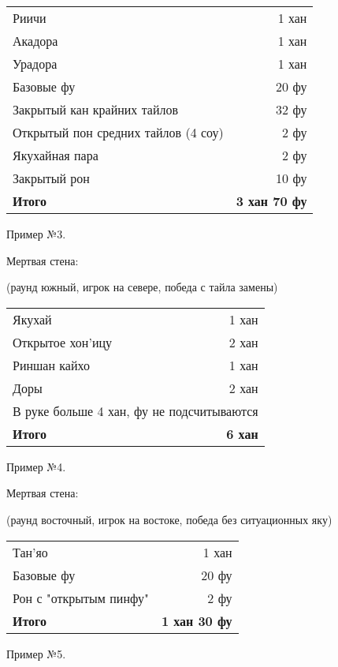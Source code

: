\noindent\begin{tabular}{lr}
	Риичи & 1 хан \\
	Акадора & 1 хан \\
	Урадора & 1 хан \\
	Базовые фу & 20 фу \\
	Закрытый кан крайних тайлов & 32 фу \\
	Открытый пон средних тайлов (4 соу) & 2 фу \\
	Якухайная пара & 2 фу \\
	Закрытый рон & 10 фу \\
	\midrule
	\textbf{Итого} & \textbf{3 хан 70 фу} \\
\end{tabular}

Пример №3. 

 \hfill {}

Мертвая стена: 

(раунд южный, игрок на севере, победа с тайла замены)

\noindent\begin{tabular}{lr}
	Якухай & 1 хан \\
	Открытое хон'ицу & 2 хан \\
	Риншан кайхо & 1 хан \\
	Доры & 2 хан \\
	\multicolumn{2}{l}{В руке больше 4 хан, фу не подсчитываются} \\
	\midrule
	\textbf{Итого} & \textbf{6 хан} \\
\end{tabular}

Пример №4.

 \hfill {}

Мертвая стена: 

(раунд восточный, игрок на востоке, победа без ситуационных яку)

\noindent\begin{tabular}{lr}
	Тан'яо & 1 хан \\
	Базовые фу & 20 фу \\
	Рон с "открытым пинфу" & 2 фу \\
	\midrule
	\textbf{Итого} & \textbf{1 хан 30 фу} \\
\end{tabular}

Пример №5.


